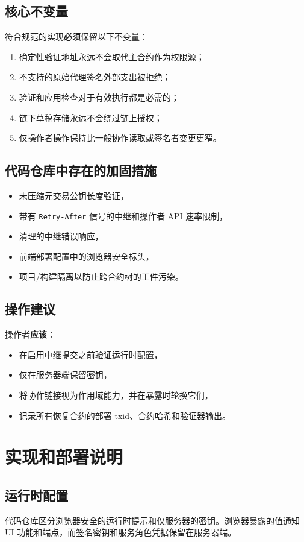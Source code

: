\documentclass[11pt]{article}
\newcommand{\code}[1]{\texttt{#1}}
\newcommand{\must}{\textbf{必须}}
\newcommand{\should}{\textbf{应该}}
\begin{document}
\subsection{核心不变量}
符合规范的实现\must{}保留以下不变量：
\begin{enumerate}
  \item 确定性验证地址永远不会取代主合约作为权限源；
  \item 不支持的原始代理签名外部支出被拒绝；
  \item 验证和应用检查对于有效执行都是必需的；
  \item 链下草稿存储永远不会绕过链上授权；
  \item 仅操作者操作保持比一般协作读取或签名者变更更窄。
\end{enumerate}

\subsection{代码仓库中存在的加固措施}
\begin{itemize}
  \item 未压缩元交易公钥长度验证，
  \item 带有 \code{Retry-After} 信号的中继和操作者 API 速率限制，
  \item 清理的中继错误响应，
  \item 前端部署配置中的浏览器安全标头，
  \item 项目/构建隔离以防止跨合约树的工件污染。
\end{itemize}

\subsection{操作建议}
操作者\should{}：
\begin{itemize}
  \item 在启用中继提交之前验证运行时配置，
  \item 仅在服务器端保留密钥，
  \item 将协作链接视为作用域能力，并在暴露时轮换它们，
  \item 记录所有恢复合约的部署 txid、合约哈希和验证器输出。
\end{itemize}

\section{实现和部署说明}
\subsection{运行时配置}
代码仓库区分浏览器安全的运行时提示和仅服务器的密钥。浏览器暴露的值通知 UI 功能和端点，而签名密钥和服务角色凭据保留在服务器端。
\end{document}
